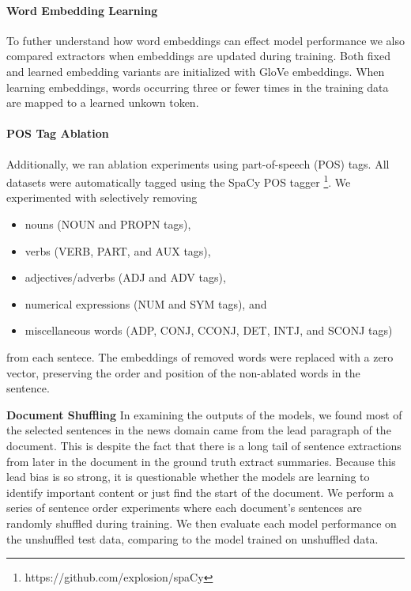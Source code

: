 \paragraph{Word Embedding Learning}{To futher understand how word 
embeddings 
can
effect model performance we also compared extractors when embeddings 
are updated during training. Both fixed and learned embedding variants are 
initialized with GloVe embeddings. When learning embeddings, words occurring 
three or fewer times in the training data are mapped to a learned unkown
token.}

\paragraph{POS Tag Ablation}{Additionally, we ran ablation experiments
using part-of-speech (POS) tags. 
All datasets were automatically tagged using
the SpaCy POS tagger \footnote{https://github.com/explosion/spaCy}.   
We experimented with selectively removing 
\begin{itemize}
    \item nouns (NOUN and PROPN tags), 
    \item verbs (VERB, PART, and AUX tags), 
    \item adjectives/adverbs (ADJ and ADV tags), 
    \item numerical expressions (NUM and SYM tags), and 
    \item miscellaneous words (ADP, CONJ, CCONJ, DET, INTJ, and SCONJ tags)
\end{itemize}
from each sentece. 
The embeddings of removed words were replaced with a zero vector,
preserving the order and position of the non-ablated words in the sentence.
}

\textbf{Document Shuffling} In examining the outputs of the models, we found
most of the selected sentences in the news domain came from the lead paragraph
of the document. This is despite the fact that there is a long tail of 
sentence extractions from later in the document in the ground truth extract 
summaries. Because this lead bias is so strong, it is questionable whether
the models are learning to identify important content or just find the start
of the document. We perform a series of sentence order experiments where 
each document's sentences are randomly shuffled during training. We then
evaluate each model performance on the unshuffled test data, comparing to 
the model trained on unshuffled data. 

